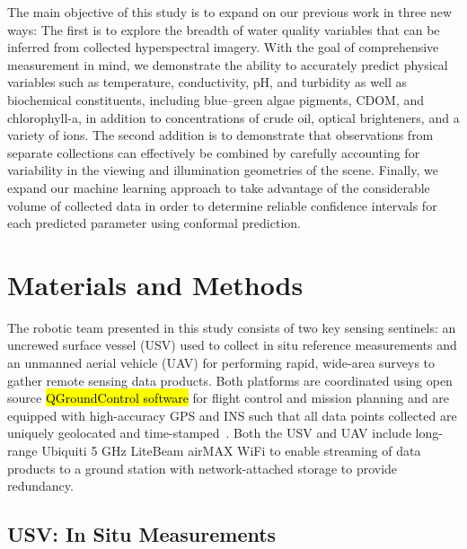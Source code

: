 \documentclass[remotesensing,article,accept,pdftex,moreauthors]{Definitions/mdpi}
\begin{document}
The main objective of this study is to expand on our previous work in three new ways: The first is to explore the breadth of water quality variables that can be inferred from collected hyperspectral imagery. With the goal of comprehensive measurement in mind, we demonstrate the ability to accurately predict physical variables such as temperature, conductivity, pH, and turbidity as well as biochemical constituents, including blue--green algae pigments, CDOM, and chlorophyll-a, in addition to concentrations of crude oil, optical brighteners, and a variety of ions. The second addition is to demonstrate that observations from separate collections can effectively be combined by carefully accounting for variability in the viewing and illumination geometries of the scene. Finally, we expand our machine learning approach to take advantage of the considerable volume of collected data in order to determine reliable confidence intervals for each predicted parameter using conformal prediction.




\section{Materials and Methods}

 The robotic team presented in this study consists of two key sensing sentinels: an uncrewed surface vessel (USV) used to collect in situ reference measurements and an unmanned aerial vehicle (UAV) for performing rapid, wide-area surveys to gather remote sensing data products. Both platforms are coordinated using open source \hl{QGroundControl software} %
 for flight control and mission planning and are equipped with high-accuracy GPS and INS such that all data points collected are uniquely geolocated and time-stamped~\cite{qgroundcontrol}. Both the USV and UAV include long-range Ubiquiti 5 GHz LiteBeam airMAX WiFi to enable streaming of data products to a ground station with network-attached storage to provide redundancy.

\subsection{USV: In Situ Measurements}
\end{document}
